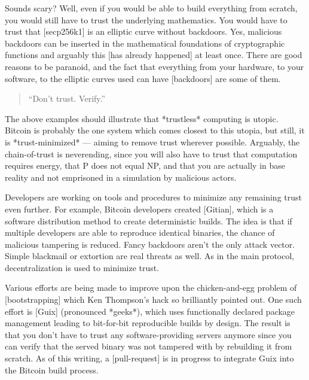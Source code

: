 Sounds scary? Well, even if you would be able to build everything from
scratch, you would still have to trust the underlying mathematics. You
would have to trust that [secp256k1] is an elliptic curve without
backdoors. Yes, malicious backdoors can be inserted in the mathematical
foundations of cryptographic functions and arguably this [has already
happened] at least once. There are good reasons to be paranoid, and the
fact that everything from your hardware, to your software, to the
elliptic curves used can have [backdoors] are some of them.

\begin{quotation}
``Don't trust. Verify.''
\end{quotation}

The above examples should illustrate that *trustless* computing is
utopic. Bitcoin is probably the one system which comes closest to this
utopia, but still, it is *trust-minimized* --- aiming to remove trust
wherever possible. Arguably, the chain-of-trust is neverending, since
you will also have to trust that computation requires energy, that P
does not equal NP, and that you are actually in base reality and not
emprisoned in a simulation by malicious actors.

Developers are working on tools and procedures to minimize any remaining
trust even further. For example, Bitcoin developers created [Gitian],
which is a software distribution method to create deterministic builds.
The idea is that if multiple developers are able to reproduce identical
binaries, the chance of malicious tampering is reduced. Fancy backdoors
aren't the only attack vector. Simple blackmail or extortion are real
threats as well. As in the main protocol, decentralization is used to
minimize trust.

Various efforts are being made to improve upon the chicken-and-egg
problem of [bootstrapping] which Ken Thompson's hack so brilliantly
pointed out. One such effort is [Guix] (pronounced *geeks*), which uses
functionally declared package management leading to bit-for-bit
reproducible builds by design. The result is that you don't have to
trust any software-providing servers anymore since you can verify that
the served binary was not tampered with by rebuilding it from scratch.
As of this writing, a [pull-request] is in progress to integrate Guix
into the Bitcoin build process.


